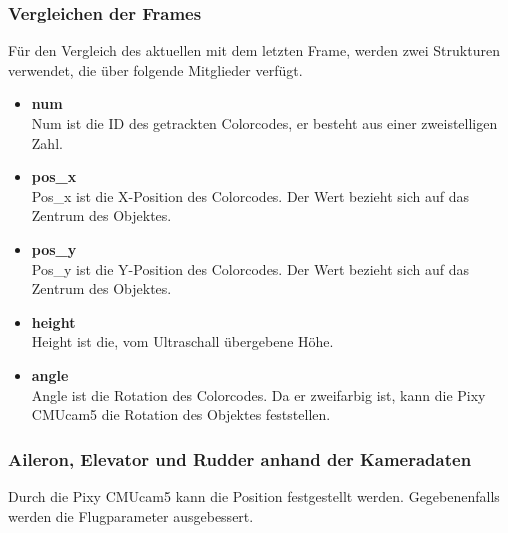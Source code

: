     \subsubsection{Vergleichen der Frames}
    Für den Vergleich des aktuellen mit dem letzten Frame, werden zwei Strukturen verwendet, die über folgende Mitglieder verfügt.
    \begin{itemize}
    \item \textbf{num}\\
    Num ist die ID des getrackten Colorcodes, er besteht aus einer zweistelligen Zahl.
    \item \textbf{pos\_x}\\
    Pos\_x ist die X-Position des Colorcodes. Der Wert bezieht sich auf das Zentrum des Objektes.
    \item \textbf{pos\_y}\\
    Pos\_y ist die Y-Position des Colorcodes. Der Wert bezieht sich auf das Zentrum des Objektes.
    \item \textbf{height}\\
    Height ist die, vom Ultraschall übergebene Höhe.
    \item \textbf{angle}\\
    Angle ist die Rotation des Colorcodes. Da er zweifarbig ist, kann die Pixy CMUcam5 die Rotation des Objektes feststellen.
    \end{itemize}




    \subsubsection{Aileron, Elevator und Rudder anhand der Kameradaten}
    Durch die Pixy CMUcam5 kann die Position festgestellt werden. Gegebenenfalls werden die Flugparameter ausgebessert.

